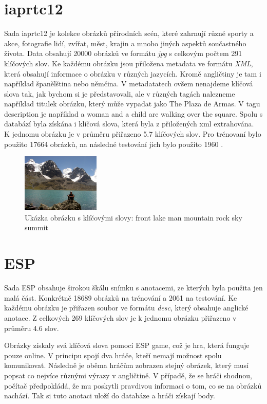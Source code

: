 \documentclass[czech,BP]{thesiskiv}
\begin{document}
\section{iaprtc12}
\par Sada iaprtc12 je kolekce obrázků přírodních scén, které zahrnují různé sporty a akce, fotografie lidí, zvířat, měst, krajin a mnoho jiných aspektů součastného života. Data obsahují \num{20 000} obrázků ve formátu \textit{jpg} s celkovým počtem \num{291} klíčových slov. Ke každému obrázku jsou přiložena metadata ve formátu \textit{XML}, která obsahují informace o obrázku v různých jazycích. Kromě angličtiny je tam i například španělština nebo němčina. V metadatatech ovšem nenajdeme klíčová slova tak, jak bychom si je představovali, ale v různých tagách nalezneme například titulek obrázku, který může vypadat jako The Plaza de Armas. V tagu description je například  a woman and a child are walking over the square. Spolu s databází byla získána i klíčová slova, která byla z přiložených xml extrahována.\\
K jednomu obrázku je v průměru přiřazeno \num{5.7} klíčových slov. Pro trénovaní bylo použito \num{17 664} obrázků, na následné testování jich bylo použito \num{1960} \cite{ESPvon2004labeling}. 


\begin{figure}[h]
		\centering
		\includegraphics[width=140px]{./img/iaprtc12.jpg}	
		\caption{Ukázka obrázku s klíčovými slovy: front lake man mountain rock sky summit}
\end{figure}

\section{ESP}
\par Sada ESP obsahuje širokou škálu snímku s anotacemi, ze kterých byla použita jen malá část. Konkrétně \num{18 689} obrázků na trénování a \num{2061} na testování. Ke každému obrázku je přiřazen soubor ve formátu \textit{desc}, který obsahuje anglické anotace. Z celkových 269 klíčových slov je k jednomu obrázku přiřazeno v průměru 4.6 slov.

\par Obrázky získaly svá klíčová slova pomocí ESP game, což je hra, která funguje pouze online. V principu spojí dva hráče, kteří nemají možnost spolu komunikovat. Následně je oběma hráčům zobrazen stejný obrázek, který musí popsat co nejvíce různými výrazy v angličtině. V případě, že se hráči shodnou, počítač předpokládá, že mu poskytli pravdivou informaci o tom, co se na obrázků nachází. Tak si tuto anotaci uloží do databáze a hráči získají body.
\end{document}
